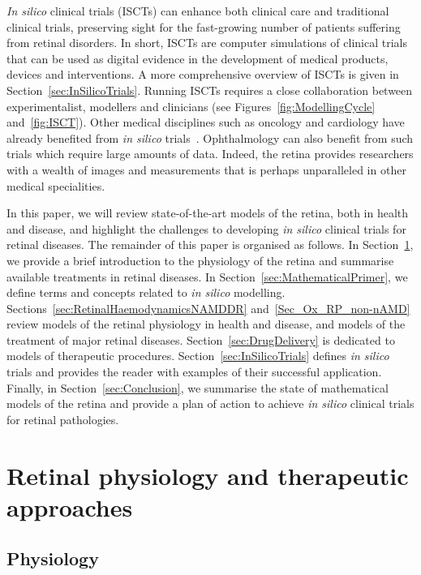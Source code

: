 \documentclass{article}
\begin{document}
\textit{In silico} clinical trials (ISCTs) can enhance both clinical care and traditional clinical trials, preserving sight for the fast-growing number of patients suffering from retinal disorders.
In short, ISCTs are computer simulations of clinical trials that can be used as digital evidence in the development of medical products, devices and interventions.
A more comprehensive overview of ISCTs is given in Section~\ref{sec:InSilicoTrials}.
Running ISCTs requires a close collaboration between experimentalist, modellers and clinicians (see Figures~\ref{fig:ModellingCycle} and~\ref{fig:ISCT}).
Other medical disciplines such as oncology and cardiology have already benefited from \textit{in silico} trials~\cite{Gaffney2022,Ravvaz2017}.
Ophthalmology can also benefit from such trials which require large amounts of data.
Indeed, the retina provides researchers with a wealth of images and measurements that is perhaps unparalleled in other medical specialities.

In this paper, we will review state-of-the-art models of the retina, both in health and disease, and highlight the challenges to developing \textit{in silico} clinical trials for retinal diseases.
The remainder of this paper is organised as follows.
In Section~\ref{sec:RetinalPhysiology}, we provide a brief introduction to the physiology of the retina and summarise available treatments in retinal diseases.
In Section~\ref{sec:MathematicalPrimer}, we define terms and concepts related to \textit{in silico} modelling.
Sections~\ref{sec:RetinalHaemodynamicsNAMDDR} and~\ref{Sec_Ox_RP_non-nAMD} review models of the retinal physiology in health and disease, and models of the treatment of major retinal diseases.
Section~\ref{sec:DrugDelivery} is dedicated to models of therapeutic procedures.
Section~\ref{sec:InSilicoTrials} defines \textit{in silico} trials and provides the reader with examples of their successful application.
Finally, in Section~\ref{sec:Conclusion}, we summarise the state of mathematical models of the retina and provide a plan of action to achieve \textit{in silico} clinical trials for retinal pathologies.

\section{Retinal physiology and therapeutic approaches}\label{sec:RetinalPhysiology}

\subsection{Physiology}
\end{document}
